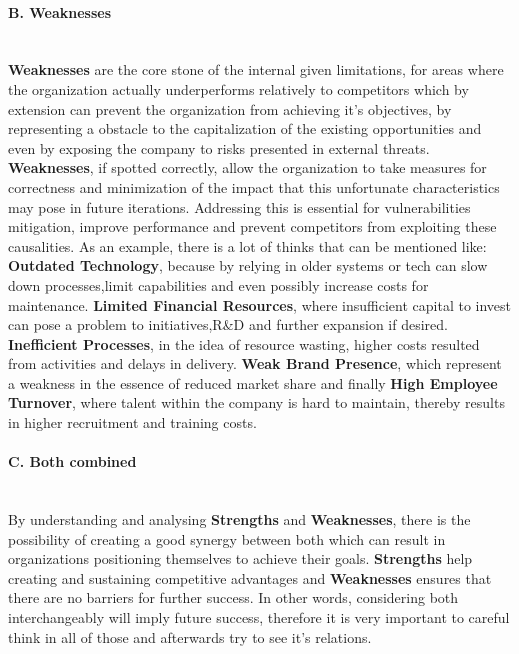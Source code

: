 \paragraph{B. Weaknesses}\mbox{}\\
\textbf{Weaknesses} are the core stone of the internal given limitations, for areas where the organization actually underperforms relatively to competitors which by extension can prevent the organization from achieving it's objectives, by representing a obstacle to the capitalization of the existing opportunities and even  by exposing the company to risks presented in external threats. \textbf{Weaknesses}, if spotted correctly, allow the organization to take measures for correctness and minimization of the impact that this unfortunate characteristics may pose in future iterations. Addressing this is essential for vulnerabilities mitigation, improve performance and prevent competitors from exploiting these causalities.
As an example, there is a lot of thinks that can be mentioned like: \textbf{Outdated Technology}, because by relying in older systems or tech can slow down processes,limit capabilities and even possibly increase costs for maintenance. \textbf{Limited Financial Resources}, where insufficient capital to invest can pose a problem to initiatives,R\&D and further expansion if desired. \textbf{Inefficient Processes}, in the idea of resource wasting, higher costs resulted from activities and delays in delivery. \textbf{Weak Brand Presence}, which represent a weakness in the essence of reduced market share and finally \textbf{High Employee Turnover}, where talent within the company is hard to maintain, thereby results in higher recruitment and training costs.

\paragraph{C. Both combined}\mbox{}\\
By understanding and analysing \textbf{Strengths} and \textbf{Weaknesses}, there is the possibility of creating a good synergy between both which can result in organizations positioning themselves to achieve their goals. \textbf{Strengths} help creating and sustaining competitive advantages and \textbf{Weaknesses} ensures that there are no barriers for further success. In other words, considering both interchangeably will imply future success, therefore it is very important to careful think in all of those and afterwards try to see it's relations.


